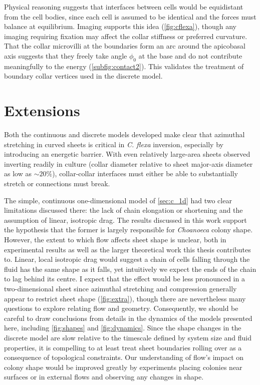 Physical reasoning suggests that interfaces between cells would be equidistant from the cell bodies, since each cell is assumed to be identical and the forces must balance at equilibrium. 
Imaging supports this idea (\cref{fig:cflexa}), though any imaging requiring fixation may affect the collar stiffness or preferred curvature.
That the collar microvilli at the boundaries form an arc around the apicobasal axis suggests that they freely take angle $\phi_0$ at the base and do not contribute meaningfully to the energy (\cref{subfig:contact2}). 
This validates the treatment of boundary collar vertices used in the discrete model.

\section{Extensions}

Both the continuous and discrete models developed make clear that azimuthal stretching in curved sheets is critical in \textit{C. flexa} inversion, especially by introducing an energetic barrier.
With even relatively large-area sheets observed inverting readily in culture (collar diameter relative to sheet major-axis diameter as low as $\sim20\%$), collar-collar interfaces must either be able to substantially stretch or connections must break.

The simple, continuous one-dimensional model of \cref{sec:c_1d} had two clear limitations discussed there: the lack of chain elongation or shortening and the assumption of linear, isotropic drag.
The results discussed in this work support the hypothesis that the former is largely responsible for \textit{Choanoeca} colony shape.
However, the extent to which flow affects sheet shape is unclear, both in experimental results \citep{brunet2019} as well as the larger theoretical work this thesis contributes to.
Linear, local isotropic drag would suggest a chain of cells falling through the fluid has the same shape as it falls, yet intuitively we expect the ends of the chain to lag behind its centre.
I expect that the effect would be less pronounced in a two-dimensional sheet since azimuthal stretching and compression generally appear to restrict sheet shape (\cref{fig:extra}), though there are nevertheless many questions to explore relating flow and geometry.
Consequently, we should be careful to draw conclusions from details in the dynamics of the models presented here, including \cref{fig:shapes} and \cref{fig:dynamics}.
Since the shape changes in the discrete model are slow relative to the timescale defined by system size and fluid properties, it is compelling to at least treat sheet boundaries rolling over as a consequence of topological constraints.
Our understanding of flow's impact on colony shape would be improved greatly by experiments placing colonies near surfaces or in external flows and observing any changes in shape.

